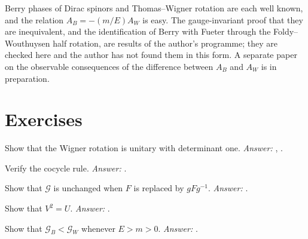 \begin{standsbox}
Berry phases of Dirac spinors and Thomas--Wigner rotation are each well known, and the relation $A_B=-(m/E)A_W$ is easy. The gauge-invariant proof that they are inequivalent, and the identification of Berry with Fueter through the Foldy--Wouthuysen half rotation, are results of the author's programme; they are checked here and the author has not found them in this form. A separate paper on the observable consequences of the difference between $A_B$ and $A_W$ is in preparation.
\end{standsbox}

\section*{Exercises}
\begin{exercise}Show that the Wigner rotation is unitary with determinant one. \emph{Answer:} , .\end{exercise}
\begin{exercise}Verify the cocycle rule. \emph{Answer:} .\end{exercise}
\begin{exercise}Show that $\mathcal G$ is unchanged when $F$ is replaced by $gFg^{-1}$. \emph{Answer:} .\end{exercise}
\begin{exercise}Show that $V^2=U$. \emph{Answer:} .\end{exercise}
\begin{exercise}Show that $\mathcal G_B<\mathcal G_W$ whenever $E>m>0$. \emph{Answer:} .\end{exercise}
